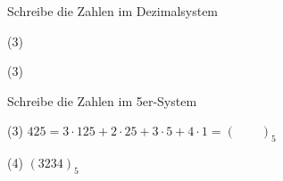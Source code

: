 
\begin{Aufgabe*}{3}
	Schreibe die Zahlen im Dezimalsystem
	\begin{tasks}(3)
		\task {}
		\task {}
		\task {}
	\end{tasks}
\end{Aufgabe*}
\begin{Loesung}
	\begin{tasks}(3)
		\task {} \Punkt
		\task {} \Punkt
		\task {} \Punkt
	\end{tasks}
\end{Loesung}
\begin{Aufgabe*}{4}
	Schreibe die Zahlen im 5er-System
	\begin{tasks}(3)
		\task* $425=3\cdot 125+2\cdot 25 + 3\cdot 5 + 4\cdot 1 = {(\qquad)}_5$
		\task  {}
		\task  {}
		\task  {}
	\end{tasks}
\end{Aufgabe*}
\begin{Loesung}
	\begin{tasks}(4)
		\task ${(3234)}_5$
		\task {} \Punkt
		\task {} \Punkt
		\task {} \Punkt
	\end{tasks}
\end{Loesung}
